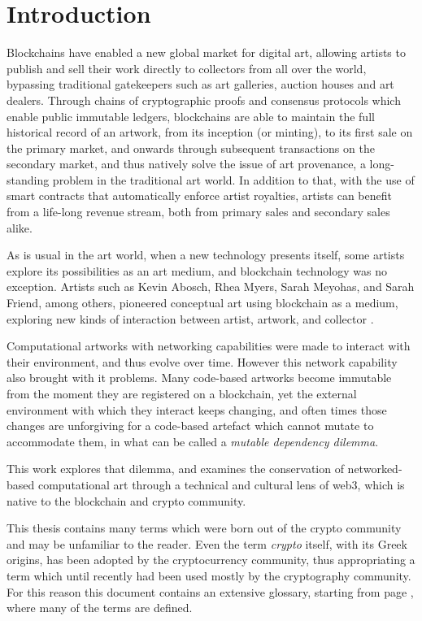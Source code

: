 \chapter{Introduction}

Blockchains have enabled a new global market for digital art, allowing artists to publish and sell their work directly to collectors from all over the world, bypassing traditional gatekeepers such as art galleries, auction houses and art dealers. Through chains of cryptographic proofs and consensus protocols which enable public immutable ledgers, blockchains are able to maintain the full historical record of an artwork, from its inception (or \gls{minting}), to its first sale on the \gls{primary market}, and onwards through subsequent transactions on the \gls{secondary market}, and thus natively solve the issue of art provenance, a long-standing problem in the traditional art world. In addition to that, with the use of smart contracts that automatically enforce artist royalties, artists can benefit from a life-long revenue stream, both from \gls{primary sales} and \gls{secondary sales} alike.

As is usual in the art world, when a new technology presents itself, some artists explore its possibilities as an art medium, and blockchain technology was no exception. Artists such as Kevin Abosch, Rhea Myers, Sarah Meyohas, and Sarah Friend, among others, pioneered \gls{conceptual art} using blockchain as a medium, exploring new kinds of interaction between artist, artwork, and collector \cite{rcsBlockchainMedium2022}.

Computational artworks with networking capabilities were made to interact with their environment, and thus evolve over time. However this network capability also brought with it problems. Many code-based artworks become immutable from the moment they are registered on a blockchain, yet the external environment with which they interact keeps changing, and often times those changes are unforgiving for a code-based artefact which cannot mutate to accommodate them, in what can be called a \emph{mutable dependency dilemma}.

This work explores that dilemma, and examines the conservation of networked-based computational art through a technical and cultural lens of \gls{web3}, which is native to the blockchain and crypto community.

This thesis contains many terms which were born out of the crypto community and may be unfamiliar to the reader. Even the term \emph{crypto} itself, with its Greek origins, has been adopted by the cryptocurrency community, thus appropriating a term which until recently had been used mostly by the cryptography community. For this reason this document contains an extensive glossary, starting from page \pageref{sec:glossary}, where many of the terms are defined.

